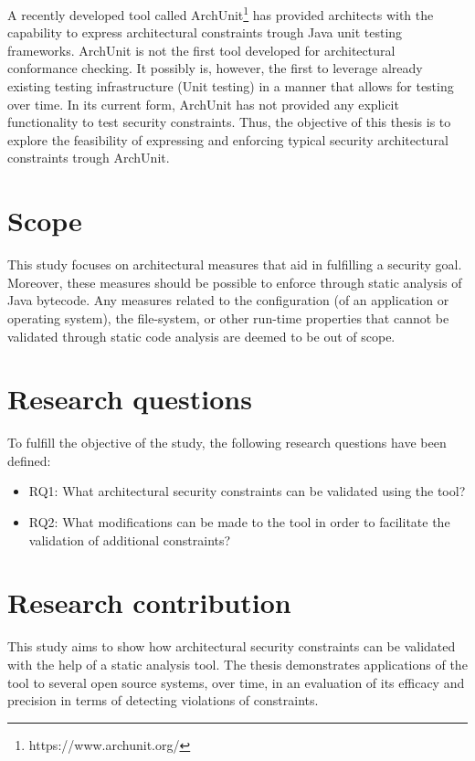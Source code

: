 A recently developed tool called ArchUnit\footnote{https://www.archunit.org/} has provided architects with the capability to express architectural constraints trough Java unit testing frameworks. ArchUnit is not the first tool developed for architectural conformance checking. It possibly is, however, the first to leverage already existing testing infrastructure (Unit testing) in a manner that allows for testing over time. In its current form, ArchUnit has not provided any explicit functionality to test security constraints. Thus, the objective of this thesis is to explore the feasibility of expressing and enforcing typical security architectural constraints trough ArchUnit.

\section{Scope}

This study focuses on architectural measures that aid in fulfilling a security goal. Moreover, these measures should be possible to enforce through static analysis of Java bytecode. Any measures related to the configuration (of an application or operating system), the file-system, or other run-time properties that cannot be validated through static code analysis are deemed to be out of scope.

\section{Research questions}
To fulfill the objective of the study, the following research questions have been defined:

\begin{itemize}
    \item RQ1: What architectural security constraints can be validated using the tool?
    \item RQ2: What modifications can be made to the tool in order to facilitate the validation of additional constraints?
\end{itemize}

\section{Research contribution}

This study aims to show how architectural security constraints can be validated with the help of a static analysis tool. The thesis demonstrates applications of the tool to several open source systems, over time, in an evaluation of its efficacy and precision in terms of detecting violations of constraints.

